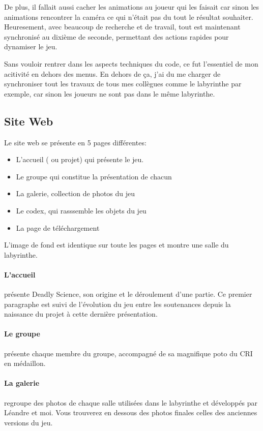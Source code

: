 \documentclass{article}
\begin{document}
De plus, il fallait aussi cacher les animations au joueur qui les faisait car 
sinon les animations rencontrer la caméra ce qui n'était pas du tout le résultat souhaiter. Heuresement, avec beaucoup de recherche et de travail, tout est maintenant 
synchronisé au dixième de seconde, permettant des actions rapides pour dynamiser le jeu.

Sans vouloir rentrer dans les aspects techniques du code, ce fut l'essentiel de mon acitivité en dehors des menus. En dehors de ça, j'ai du me charger de synchroniser tout les travaux de tous mes collègues comme le labyrinthe par exemple, car sinon les joueurs ne sont pas dans le même labyrinthe. 

\subsection{Site Web}
Le site web se présente en 5 pages différentes:
\begin{itemize}
	\item{} L'accueil ( ou projet) qui présente le jeu.
	\item{} Le groupe qui constitue la présentation de chacun
	\item{} La galerie, collection de photos du jeu
	\item{} Le codex, qui rasssemble les objets du jeu
	\item{} La page de téléchargement
\end{itemize}
L'image de fond est identique sur toute les pages et montre une salle du labyrinthe.

\paragraph{L'accueil}présente Deadly Science, son origine et le déroulement d'une partie. Ce premier paragraphe est suivi de l'évolution du jeu entre les soutenances depuis la naissance du projet à cette dernière présentation.

\paragraph{Le groupe}présente chaque membre du groupe, accompagné de sa magnifique poto du CRI en médaillon.

\paragraph{La galerie}regroupe des photos de chaque salle utilisées dans le labyrinthe et développés par Léandre et moi. Vous trouverez en dessous des photos finales celles des anciennes versions du jeu.
\end{document}
